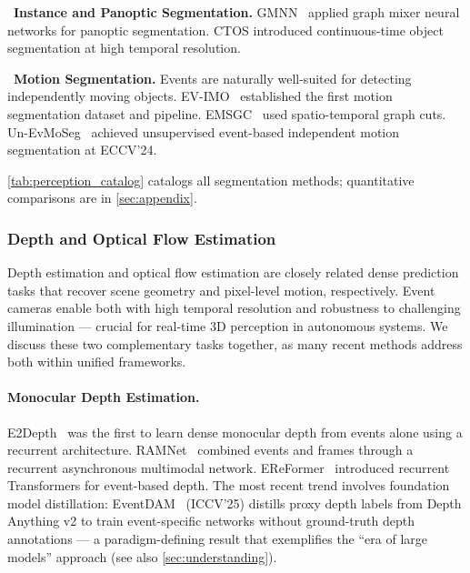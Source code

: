 \noindent{}~\textbf{Instance and Panoptic Segmentation.} GMNN~\cite{yang2023gmnn} applied graph mixer neural networks for panoptic segmentation. CTOS introduced continuous-time object segmentation at high temporal resolution.

\noindent{}~\textbf{Motion Segmentation.} Events are naturally well-suited for detecting independently moving objects. EV-IMO~\cite{mitrokhin2019evimo} established the first motion segmentation dataset and pipeline. EMSGC~\cite{zhou2021emsgc} used spatio-temporal graph cuts. Un-EvMoSeg~\cite{zhang2024unevmoseg} achieved unsupervised event-based independent motion segmentation at ECCV'24.

\cref{tab:perception_catalog} catalogs all segmentation methods; quantitative comparisons are in \cref{sec:appendix}.


\subsubsection{Depth and Optical Flow Estimation}
\label{sec:perception_depth_flow}

Depth estimation and optical flow estimation are closely related dense prediction tasks that recover scene geometry and pixel-level motion, respectively. Event cameras enable both with high temporal resolution and robustness to challenging illumination --- crucial for real-time 3D perception in autonomous systems. We discuss these two complementary tasks together, as many recent methods address both within unified frameworks.

\paragraph{Monocular Depth Estimation.}
E2Depth~\cite{hidalgo2020e2depth} was the first to learn dense monocular depth from events alone using a recurrent architecture. RAMNet~\cite{gehrig2021ramnet} combined events and frames through a recurrent asynchronous multimodal network. EReFormer~\cite{xu2024ereformer} introduced recurrent Transformers for event-based depth. The most recent trend involves foundation model distillation: EventDAM~\cite{xu2025depthanycvent} (ICCV'25) distills proxy depth labels from Depth Anything v2 to train event-specific networks without ground-truth depth annotations --- a paradigm-defining result that exemplifies the ``era of large models'' approach (see also \cref{sec:understanding}).

